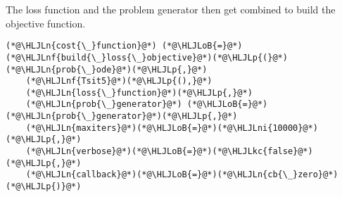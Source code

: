 \documentclass[12pt,a4paper]{article}
\newcommand{\HLJLkc}[1]{\textcolor[RGB]{59,151,46}{\textit{#1}}}
\newcommand{\HLJLn}[1]{#1}
\newcommand{\HLJLnf}[1]{\textcolor[RGB]{66,102,213}{#1}}
\newcommand{\HLJLni}[1]{\textcolor[RGB]{59,151,46}{#1}}
\newcommand{\HLJLoB}[1]{\textcolor[RGB]{102,102,102}{\textbf{#1}}}
\newcommand{\HLJLp}[1]{#1}
\begin{document}
The loss function and the problem generator then get combined to build the objective function.


\begin{lstlisting}
(*@\HLJLn{cost{\_}function}@*) (*@\HLJLoB{=}@*) (*@\HLJLnf{build{\_}loss{\_}objective}@*)(*@\HLJLp{(}@*)(*@\HLJLn{prob{\_}ode}@*)(*@\HLJLp{,}@*)
    (*@\HLJLnf{Tsit5}@*)(*@\HLJLp{(),}@*)
    (*@\HLJLn{loss{\_}function}@*)(*@\HLJLp{,}@*)
    (*@\HLJLn{prob{\_}generator}@*) (*@\HLJLoB{=}@*) (*@\HLJLn{prob{\_}generator}@*)(*@\HLJLp{,}@*)
    (*@\HLJLn{maxiters}@*)(*@\HLJLoB{=}@*)(*@\HLJLni{10000}@*)(*@\HLJLp{,}@*)
    (*@\HLJLn{verbose}@*)(*@\HLJLoB{=}@*)(*@\HLJLkc{false}@*)(*@\HLJLp{,}@*)
    (*@\HLJLn{callback}@*)(*@\HLJLoB{=}@*)(*@\HLJLn{cb{\_}zero}@*)(*@\HLJLp{)}@*)
\end{lstlisting}
\end{document}
